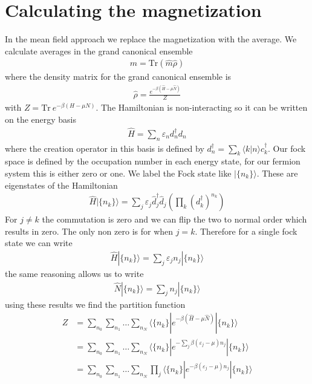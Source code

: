 \documentclass[11pt]{article}
\begin{document}
\section{Calculating the magnetization}
In the mean field approach we replace the magnetization with the average. We calculate averages in the grand canonical ensemble
\begin{gather}
    m = \text{Tr}(\hat m \hat \rho)
\end{gather}
where the density matrix for the grand canonical ensemble is
\begin{gather}
    \hat \rho = \frac{e^{-\beta(\hat H-\mu \hat N)}}{Z}
\end{gather}
with $Z = \text{Tr} ~e^{-\beta (H - \mu N)}$. The Hamiltonian is non-interacting so it can be written on the energy basis
\begin{gather}
    \hat H = \sum_n \varepsilon_n d_n^\dagger d_n 
\end{gather}
where the creation operator in this basis is defined by $d_n^{\dagger} = \sum_k \langle k|n\rangle c^\dagger_k$. Our fock space is defined by the occupation number in each energy state, for our fermion system this is either zero or one. We label the Fock state like $|\{n_k\}\rangle$. These are eigenstates of the Hamiltonian
\begin{align}
    \hat H|\{n_k\}\rangle = \sum_j \varepsilon_j \hat d_j^\dagger \hat d_j \left(\prod_k 
    \left(d_k^\dagger\right)^{n_k}\right)
\end{align}
For $j\neq k$ the commutation is zero and we can flip the two to normal order which results in zero. The only non zero is for when $j=k$. Therefore for a single fock state we can write
\begin{gather}
    \hat H|\{n_k\}\rangle = \sum_j \varepsilon_j n_j |\{n_k\}\rangle
\end{gather}
the same reasoning allows us to write
\begin{gather}
    \hat N |\{n_k\}\rangle = \sum_jn_j|\{n_k\}\rangle
\end{gather}
using these results we find the partition function
\begin{align}
    Z &= \sum_{n_0}\sum_{n_1}\ldots\sum_{n_N} \langle \{n_k\}|e^{-\beta(\hat H - \mu \hat N)}|\{n_k\}\rangle \\\nonumber
    &=\sum_{n_0}\sum_{n_1}\ldots\sum_{n_N} \langle \{n_k\}|e^{-\sum_j\beta(\varepsilon_j - \mu)n_j}|\{n_k\}\rangle \\\nonumber
    &= \sum_{n_0}\sum_{n_1}\ldots\sum_{n_N} \prod_j  \langle \{n_k\}|e^{-\beta(\varepsilon_j-\mu)n_j}|\{n_k\}\rangle
\end{align}
\end{document}
